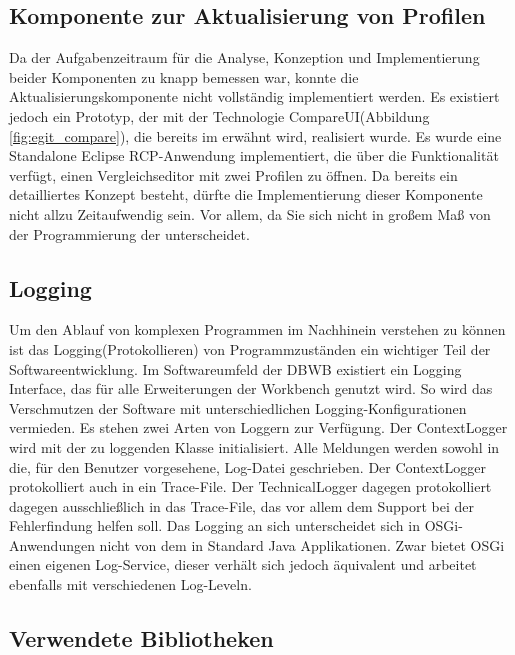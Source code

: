 {{{{{}

\subsection{Komponente zur Aktualisierung von Profilen}{
\label{sec:impl_aktualisieren}
Da der Aufgabenzeitraum für die Analyse, Konzeption und Implementierung beider Komponenten zu knapp bemessen war, konnte die Aktualisierungskomponente nicht vollständig implementiert werden. Es existiert jedoch ein Prototyp, der mit der Technologie CompareUI(Abbildung \ref{fig:egit_compare}), die bereits im  erwähnt wird, realisiert wurde. Es wurde eine Standalone Eclipse \ac{RCP}-Anwendung implementiert, die über die Funktionalität verfügt, einen Vergleichseditor mit zwei Profilen zu öffnen. Da bereits ein detailliertes Konzept besteht, dürfte die Implementierung dieser Komponente nicht allzu Zeitaufwendig sein. Vor allem, da Sie sich nicht in großem Maß von der Programmierung der  unterscheidet.    


}

\subsection{Logging}{
Um den Ablauf von komplexen Programmen im Nachhinein verstehen zu können ist das Logging(Protokollieren) von Programmzuständen ein wichtiger Teil der Softwareentwicklung. 
Im Softwareumfeld der \ac{DBWB} existiert ein Logging Interface, das für alle Erweiterungen der Workbench genutzt wird. So wird das Verschmutzen der Software mit unterschiedlichen Logging-Konfigurationen vermieden. Es stehen zwei Arten von Loggern zur Verfügung. Der ContextLogger wird mit der zu loggenden Klasse initialisiert. Alle Meldungen werden sowohl in die, für den Benutzer vorgesehene, Log-Datei geschrieben. Der ContextLogger protokolliert auch in ein Trace-File. Der TechnicalLogger dagegen protokolliert dagegen ausschließlich in das Trace-File, das vor allem dem Support bei der Fehlerfindung helfen soll. Das Logging an sich unterscheidet sich in \ac{OSGi}-Anwendungen nicht von dem in Standard Java Applikationen. Zwar bietet \ac{OSGi} einen eigenen Log-Service, dieser verhält sich jedoch äquivalent und arbeitet ebenfalls mit verschiedenen Log-Leveln. 

}



\subsection{Verwendete Bibliotheken}{


}}}}}
